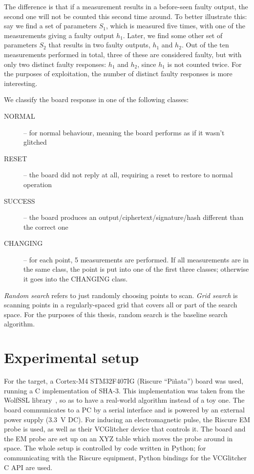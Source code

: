\documentclass[times, utf8, diplomski]{fer}
\begin{document}
The difference is that if a measurement results in a before-seen faulty output,
the second one will not be counted this second time around.
To better illustrate this: say we find a set of parameters $S_1$, which is
measured five times, with one of the measurements giving a faulty output $h_1$.
Later, we find some other set of parameters $S_2$ that results in two faulty
outputs, $h_1$ and $h_2$. Out of the ten measurements performed in total, three
of these are considered faulty, but with only two distinct faulty responses:
$h_1$ and $h_2$, since $h_1$ is not counted twice.
For the purposes of exploitation, the number of distinct faulty responses is
more interesting.

We classify the board response in one of the following classes:
\begin{description}
    \item[NORMAL]   -- for normal behaviour, meaning the board performs as if it wasn't glitched
    \item[RESET]    -- the board did not reply at all, requiring a reset to restore to normal operation
    \item[SUCCESS]  -- the board produces an output/ciphertext/signature/hash different than the correct one
    \item[CHANGING] -- for each point, 5 measurements are performed. If all measurements are in the
                       same class, the point is put into one of the first three classes; otherwise
                       it goes into the CHANGING class.
\end{description}

\emph{Random search} refers to just randomly choosing points to scan.
\emph{Grid search} is scanning points in a regularly-spaced grid that covers all
or part of the search space.
For the purposes of this thesis, random search is the baseline search algorithm.


\section{Experimental setup}\label{sec:setup}
For the target, a Cortex-M4 STM32F407IG (Riscure ``Pi\~{n}ata'') board was used,
running a C implementation of SHA-3. This implementation was taken from the WolfSSL
library~\cite{WolfSSL}, so as to have a real-world algorithm instead of a toy one.
The board communicates to a PC by a serial interface and is powered by an external
power supply (\SI{3.3}{\volt} DC). For inducing an electromagnetic pulse, the
Riscure EM probe is used, as well as their VCGlitcher device that controls it.
The board and the EM probe are set up on an XYZ table which moves the probe
around in space. The whole setup is controlled by code written in Python; for
communicating with the Riscure equipment, Python bindings for the VCGlitcher
C API are used.\footnotemark
\end{document}
